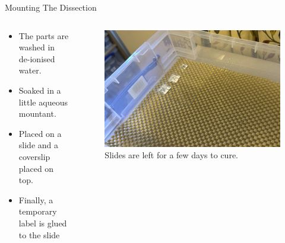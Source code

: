 \documentclass[
  ignorenonframetext,
]{beamer}
\providecommand{\tightlist}{%
  \setlength{\itemsep}{0pt}\setlength{\parskip}{0pt}}
\begin{document}
\begin{frame}{Mounting The Dissection}
\protect\hypertarget{mounting-the-dissection}{}
\begin{columns}[T]
\begin{column}{0.5\textwidth}
\begin{itemize}
\tightlist
\item
  The parts are washed in de-ionised water.
\item
  Soaked in a little aqueous mountant.
\item
  Placed on a slide and a coverslip placed on top.
\item
  Finally, a temporary label is glued to the slide
\end{itemize}
\end{column}

\begin{column}{0.5\textwidth}
\begin{figure}
\centering
\includegraphics{./images/mounted_slides.jpg}
\caption{Slides are left for a few days to cure.}
\end{figure}
\end{column}
\end{columns}
\end{frame}
\end{document}
